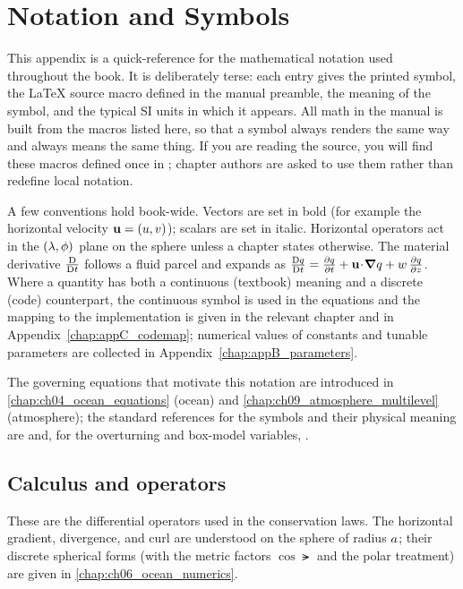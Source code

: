 \chapter{Notation and Symbols}\label{chap:appA_notation}

This appendix is a quick-reference for the mathematical notation used throughout
the book. It is deliberately terse: each entry gives the printed symbol, the
\LaTeX{} source macro defined in the manual preamble, the meaning of the symbol,
and the typical SI units in which it appears. All math in the manual is built
from the macros listed here, so that a symbol always renders the same way and
always means the same thing. If you are reading the source, you will find these
macros defined once in ; chapter authors are asked
to use them rather than redefine local notation.

A few conventions hold book-wide. Vectors are set in bold (for example the
horizontal velocity $\mathbf{u}=(u,v)$); scalars are set in italic. Horizontal
operators act in the $(\lambda,\phi)$ plane on the sphere unless a chapter states
otherwise. The material derivative $\frac{\mathrm{D}}{\mathrm{D}t}$ follows a fluid parcel and expands as
$\frac{\mathrm{D}q}{\mathrm{D}t} = \frac{\partial q}{\partial t} + \mathbf{u}\!\cdot\!\boldsymbol{\nabla} q + w\,\frac{\partial q}{\partial z}$.
Where a quantity has both a continuous (textbook) meaning and a discrete
(code) counterpart, the continuous symbol is used in the equations and the
mapping to the implementation is given in the relevant chapter and in
Appendix~\ref{chap:appC_codemap}; numerical values of constants and tunable
parameters are collected in Appendix~\ref{chap:appB_parameters}.

The governing equations that motivate this notation are introduced in
\ref{chap:ch04_ocean_equations} (ocean) and
\ref{chap:ch09_atmosphere_multilevel} (atmosphere); the standard references for
the symbols and their physical meaning are \citep{vallis2017} and, for the
overturning and box-model variables, \citep{stommel1961,marotzke1991}.

\section{Calculus and operators}

These are the differential operators used in the conservation laws. The
horizontal gradient, divergence, and curl are understood on the sphere of
radius $a$; their discrete spherical forms (with the metric factors
$\cos\lat$ and the polar treatment) are given in
\ref{chap:ch06_ocean_numerics}.

